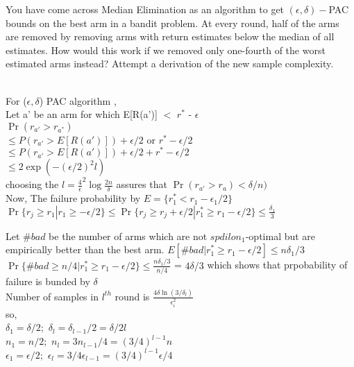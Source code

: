 \documentclass[addpoints,12pt,solution]{exam}
\begin{document}
\begin{questions}
\question[2] You have come across Median Elimination as an algorithm to get $(\epsilon, \delta)-$PAC bounds on the best arm in a bandit problem. At every round, half
of the arms are removed by removing arms with return estimates below
the median of all estimates. How would this work if we removed only
one-fourth of the worst estimated arms instead? Attempt a derivation of
the new sample complexity.

\begin{solution}
\\
For ($\epsilon,\delta$) PAC algorithm \cite{even2002pac},  \\
Let a' be an arm for which E[R(a')] $<$ $r^{*}$ - $\epsilon$ \\
$\Pr({r_{a'}} > {r_{a^{*}}})$ \\
$ \le P(r_{a'} > E[R(a')]) + \epsilon/2$ or $r^{*} - \epsilon/2$ \\
$ \le P(r_{a'} > E[R(a')]) + \epsilon/2 + r^{*} - \epsilon/2$ \\
$ \le 2 \exp(-(\epsilon/2)^{2} l )$ \\
choosing the $l=\frac{4}{\epsilon}^2 \log \frac{2n}{\delta}{}$ assures that $\Pr(r_{a'}>r_{a}) < \delta/n)$ \\

Now, The failure probability by $E = \{r^{*}_1 < r_1 - \epsilon_1 / 2\}$ \\
$\Pr\{r_{j} \geq r_1 | r_1 \geq - \epsilon /2 \} \leq  \Pr\{r_{j} \geq r_j + \epsilon /2 | r_{1}^* \geq r_1 - \epsilon /2\} \leq \frac{\delta_1}{3}$  

Let $\#bad $ be the number of arms which are not $spdilon_1$-optimal but are empirically better than the best arm. 
$E[\#bad|r_1^{*}  \geq r_1 - \epsilon/2] \leq n\delta_1/3$ \\

$\Pr\{ \#bad \geq n/4 | r_{1}^* \geq r_1 - \epsilon /2 \} \leq \frac{n\delta_1 / 3}{n/4} $ = $ 4 \delta /3$
which shows that prpobability of failure is bunded by $\delta$ \\


Number of samples in $l^{th}$ round is $\frac{4\delta \ln(3/\delta_l) }{\epsilon_i^{2}}$\\

so, \\
$\delta_1 = \delta/2 ; $ $\delta_l = \delta_{l-1}/2 = \delta/2l$ \\
$n_1 = n/2 ; $ $n_l = 3n_{l-1}/4 = (3/4)^{l-1}n$ \\
$\epsilon_1 = \epsilon/2 ; $ $\epsilon_l = 3/4 \epsilon_{l-1} = (3/4)^{l-1} \epsilon/4$ \\


\end{solution}
\end{questions}
\end{document}
